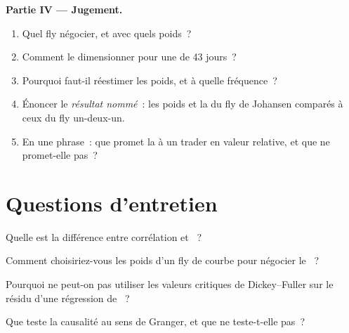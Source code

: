 \begin{problem}
\medskip\noindent\textbf{Partie IV --- Jugement.}
\begin{enumerate}[resume]
\item Quel fly négocier, et avec quels poids~?
\item Comment le dimensionner pour une  de 43 jours~?
\item Pourquoi faut-il réestimer les poids, et à quelle fréquence~?
\item Énoncer le \emph{résultat nommé}~: les poids et la  du fly de Johansen comparés à ceux du fly un-deux-un.
\item En une phrase~: que promet la  à un trader en valeur relative, et que ne promet-elle pas~?
\end{enumerate}
\end{problem}

\section{Questions d'entretien}

\begin{interviewq}\label{iq:qm:multivariate-series-and-cointegration:1}
Quelle est la différence entre corrélation et ~?
\end{interviewq}

\begin{interviewq}\label{iq:qm:multivariate-series-and-cointegration:2}
Comment choisiriez-vous les poids d'un fly de courbe pour négocier le ~?
\end{interviewq}

\begin{interviewq}\label{iq:qm:multivariate-series-and-cointegration:3}
Pourquoi ne peut-on pas utiliser les valeurs critiques de Dickey--Fuller sur le résidu d'une régression de ~?
\end{interviewq}

\begin{interviewq}\label{iq:qm:multivariate-series-and-cointegration:4}
Que teste la causalité au sens de Granger, et que ne teste-t-elle pas~?
\end{interviewq}

